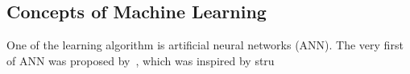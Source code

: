 \subsection{Concepts of Machine Learning}
One of the learning algorithm is artificial neural networks (ANN). The very first of ANN was proposed by~\citet{McCulloch_1943}, which was inspired by stru